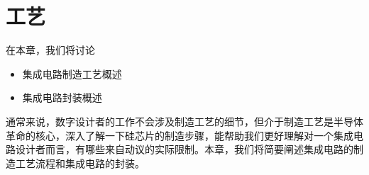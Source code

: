 \chapter{工艺}

在本章，我们将讨论
\begin{itemize}
    \item 集成电路制造工艺概述
    \item 集成电路封装概述
\end{itemize}
通常来说，数字设计者的工作不会涉及制造工艺的细节，但介于制造工艺是半导体革命的核心，深入了解一下硅芯片的制造步骤，能帮助我们更好理解对一个集成电路设计者而言，有哪些来自动议的实际限制。本章，我们将简要阐述集成电路的制造工艺流程和集成电路的封装。


